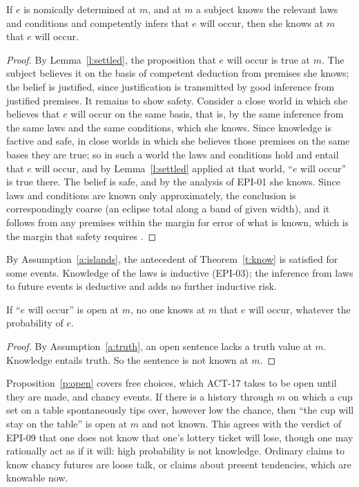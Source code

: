 \documentclass{situationist-preprint}
\begin{document}
\begin{theorem}\label{t:know}
If $e$ is nomically determined at $m$, and at $m$ a subject knows the relevant laws and conditions and competently infers that $e$ will occur, then she knows at $m$ that $e$ will occur.
\end{theorem}

\begin{proof}
By Lemma~\ref{l:settled}, the proposition that $e$ will occur is true at $m$. The subject believes it on the basis of competent deduction from premises she knows; the belief is justified, since justification is transmitted by good inference from justified premises. It remains to show safety. Consider a close world in which she believes that $e$ will occur on the same basis, that is, by the same inference from the same laws and the same conditions, which she knows. Since knowledge is factive and safe, in close worlds in which she believes those premises on the same bases they are true; so in such a world the laws and conditions hold and entail that $e$ will occur, and by Lemma~\ref{l:settled} applied at that world, \enquote{$e$ will occur} is true there. The belief is safe, and by the analysis of EPI-01 she knows. Since laws and conditions are known only approximately, the conclusion is correspondingly coarse (an eclipse total along a band of given width), and it follows from any premises within the margin for error of what is known, which is the margin that safety requires \citep{Williamson2000}.
\end{proof}

By Assumption~\ref{a:islands}, the antecedent of Theorem~\ref{t:know} is satisfied for some events. Knowledge of the laws is inductive (EPI-03); the inference from laws to future events is deductive and adds no further inductive risk.

\begin{proposition}\label{p:open}
If \enquote{$e$ will occur} is open at $m$, no one knows at $m$ that $e$ will occur, whatever the probability of $e$.
\end{proposition}

\begin{proof}
By Assumption~\ref{a:truth}, an open sentence lacks a truth value at $m$. Knowledge entails truth. So the sentence is not known at $m$.
\end{proof}

Proposition~\ref{p:open} covers free choices, which ACT-17 takes to be open until they are made, and chancy events. If there is a history through $m$ on which a cup set on a table spontaneously tips over, however low the chance, then \enquote{the cup will stay on the table} is open at $m$ and not known. This agrees with the verdict of EPI-09 that one does not know that one's lottery ticket will lose, though one may rationally act as if it will: high probability is not knowledge. Ordinary claims to know chancy futures are loose talk, or claims about present tendencies, which are knowable now.
\end{document}
